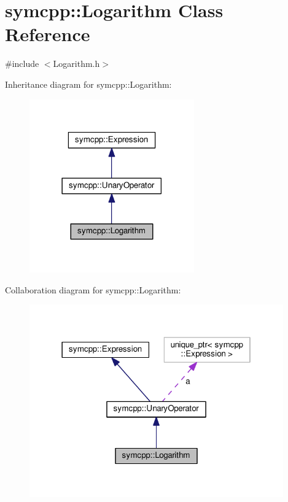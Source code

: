 \hypertarget{classsymcpp_1_1Logarithm}{}\section{symcpp\+:\+:Logarithm Class Reference}
\label{classsymcpp_1_1Logarithm}


{\ttfamily \#include $<$Logarithm.\+h$>$}



Inheritance diagram for symcpp\+:\+:Logarithm\+:\nopagebreak
\begin{figure}[H]
\begin{center}
\leavevmode
\includegraphics[width=201pt]{classsymcpp_1_1Logarithm__inherit__graph}
\end{center}
\end{figure}


Collaboration diagram for symcpp\+:\+:Logarithm\+:\nopagebreak
\begin{figure}[H]
\begin{center}
\leavevmode
\includegraphics[width=310pt]{classsymcpp_1_1Logarithm__coll__graph}
\end{center}
\end{figure}
